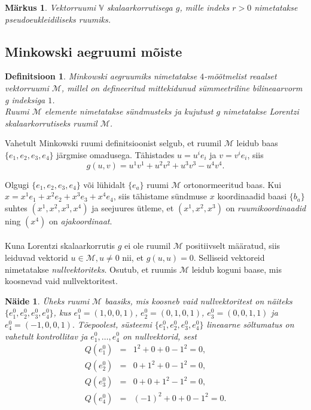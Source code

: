 \documentclass[a4paper,12pt]{article}
\newtheorem{markus}{Märkus}[section]
\newtheorem{definitsioon}{Definitsioon}[section]
\newtheorem{naide}{Näide}[section]
\numberwithin{equation}{section}
\begin{document}
\begin{markus}
Vektorruumi $\mathbb{V}$ skalaarkorrutisega $g$, mille indeks $r > 0$ nimetatakse \emph{pseudoeukleidiliseks ruumiks}.
\end{markus}


\subsection{Minkowski aegruumi mõiste}

\begin{definitsioon}
\emph{Minkowski aegruumiks} nimetatakse $4$-mõõtmelist reaalset vektorruumi $\mathcal{M}$, millel on defineeritud mittekidunud sümmeetriline bilineaarvorm g indeksiga $1$. \\
Ruumi $\mathcal{M}$ elemente nimetatakse \emph{sündmusteks} ja kujutust $g$ nimetatakse \emph{Lorentzi skalaarkorrutiseks} ruumil $\mathcal{M}$.
\end{definitsioon}
Vahetult Minkowski ruumi definitsioonist selgub, et ruumil $\mathcal{M}$ leidub baas $\{e_1, e_2, e_3, e_4\}$ järgmise omadusega. Tähistades $u = u^i e_i$ ja $v = v^i e_i$, siis
\[g\left(u, v\right) = u^1 v^1 + u^2 v^2 + u^3 v^3 - u^4 v^4.\]

Olgugi $\{e_1, e_2, e_3, e_4\}$ või lühidalt $\{e_a\}$ ruumi $\mathcal{M}$ ortonormeeritud baas. 
Kui $x = x^1 e_1 + x^2 e_2 + x^3 e_3 + x^4 e_4$, siis tähistame sündmuse $x$ koordinaadid baasi $\{b_a\}$ suhtes $\left( x^1, x^2, x^3, x^4 \right)$ ja seejuures ütleme, et $\left( x^1, x^2, x^3 \right)$ on \emph{ruumikoordinaadid} ning $\left(x^4\right)$ on \emph{ajakoordinaat}.
\paragraph{}
Kuna Lorentzi skalaarkorrutis $g$ ei ole ruumil $\mathcal{M}$ positiivselt määratud, siis leiduvad vektorid $u \in \mathcal{M}, u \neq 0$ nii, et $g \left(u, u\right) = 0$. Selliseid vektoreid nimetatakse \emph{nullvektoriteks}. Osutub, et ruumis $\mathcal{M}$ leidub koguni baase, mis koosnevad vaid nullvektoritest.

\begin{naide}
Üheks ruumi $\mathcal{M}$ baasiks, mis koosneb vaid nullvektoritest on näiteks $\{e_1^0, e_2^0, e_3^0, e_4^0\}$, kus $e_1^0 = \left(1, 0, 0, 1\right)$, $e_2^0 = \left(0, 1, 0, 1\right)$, $e_3^0 = \left(0, 0, 1, 1\right)$ ja $e_4^0 = \left(-1, 0, 0, 1\right).$
Tõepoolest, süsteemi $\{e_1^0, e_2^0, e_3^0, e_4^0\}$ lineaarne sõltumatus on vahetult kontrollitav ja $e_1^0, \dots, e_4^0$ on nullvektorid, sest
\begin{eqnarray*}
Q\left(e_1^0\right) &=& 1^2 + 0 + 0 - 1^2 = 0, \\
Q\left(e_2^0\right) &=& 0 + 1^2 + 0 - 1^2 = 0, \\
Q\left(e_3^0\right) &=& 0 + 0 + 1^2 - 1^2 = 0, \\
Q\left(e_4^0\right) &=& (-1)^2 + 0 + 0 - 1^2 = 0.
\end{eqnarray*}
\end{naide}
\end{document}
